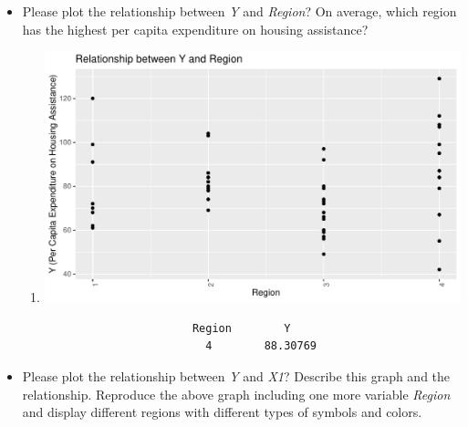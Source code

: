 \documentclass[12pt,letterpaper]{article}
\begin{document}
\begin{itemize}
\vspace{11.5cm}

\item
Please plot the relationship between \emph{Y} and \emph{Region}? On average, which region has the highest per capita expenditure on housing assistance?


   \begin{enumerate}
   	\item[]
  	\includegraphics[width=.85\textwidth]{plot.Y.Region_RJ.C.pdf}
   \end{enumerate}

    \begin{verbatim}
    	                  Region        Y
    	                    4        88.30769
    \end{verbatim} 
\vspace{.5cm}
\item
Please plot the relationship between \emph{Y} and \emph{X1}? Describe this graph and the relationship. Reproduce the above graph including one more variable \emph{Region} and display different regions with different types of symbols and colors.


\end{itemize}
\end{document}
